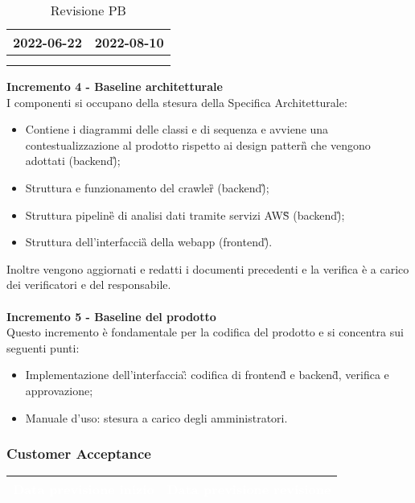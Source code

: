 {{{\begin{longtable}{C{.4\freewidth} C{.4\freewidth}}
        2022-06-22 & 2022-08-10 \\
        \bottomrule
        \\
        \caption{Revisione PB}
        \end{longtable}
    \textbf{Incremento 4 - Baseline architetturale} \\
    I componenti si occupano della stesura della Specifica Architetturale: 
    \begin{itemize}
        \item Contiene i diagrammi delle classi e di sequenza e avviene una contestualizzazione al prodotto rispetto ai design pattern\G{} che vengono adottati (backend\G);
        \item Struttura e funzionamento del crawler\G{} (backend\G);
        \item Struttura pipeline\G{} di analisi dati tramite servizi AWS\G{} (backend\G);
        \item Struttura dell'interfaccia\G{} della webapp (frontend\G).
    \end{itemize}
    Inoltre vengono aggiornati e redatti i documenti precedenti e la verifica è a carico dei verificatori e del responsabile.\\ \\
    \textbf{Incremento 5 - Baseline del prodotto} \\
    Questo incremento è fondamentale per la codifica del prodotto e si concentra sui seguenti punti:
    \begin{itemize}
        \item Implementazione dell'interfaccia\G: codifica di frontend\G{} e backend\G{}, verifica e approvazione;
        \item Manuale d'uso: stesura a carico degli amministratori.
    \end{itemize}
    }
\newpage
    \subsubsection{Customer Acceptance} {
        \setlength{\freewidth}{\dimexpr\textwidth-30\tabcolsep}
        \renewcommand{\arraystretch}{1.0}
        \setlength{\aboverulesep}{0pt}
        \setlength{\belowrulesep}{0pt}
        \begin{longtable}{C{.4\freewidth} C{.4\freewidth}}
        \toprule
        \textcolor{white}{\textbf{Data previsione inizio}}&
        \textcolor{white}{\textbf{Data previsione revisione}} \\
        \toprule
        \endhead
            

\end{longtable}}}}
